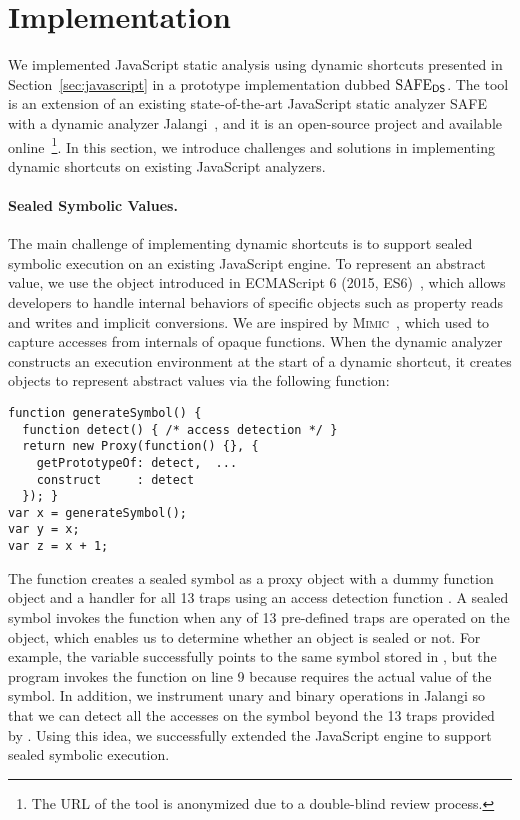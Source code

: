 \section{Implementation}\label{sec:implementation}
We implemented JavaScript static analysis using dynamic shortcuts
presented in Section~\ref{sec:javascript} in a prototype implementation dubbed
$\text{SAFE}_{\textsf{DS}}$.  The tool is an extension of an existing state-of-the-art JavaScript
static analyzer SAFE~\cite{safe, safe2} with a dynamic analyzer
Jalangi~\cite{jalangi}, and it is an open-source project and available online~\footnote{The
URL of the tool is anonymized due to a double-blind review process.}.  In this
section, we introduce challenges and solutions in implementing dynamic
shortcuts on existing JavaScript analyzers.

\paragraph{Sealed Symbolic Values.}
The main challenge of implementing dynamic shortcuts is to support sealed
symbolic execution on an existing JavaScript engine.  To represent an abstract
value, we use the  object introduced in ECMAScript 6
(2015, ES6)~\cite{es6}, which allows developers to handle internal behaviors
of specific objects such as property reads and writes and implicit conversions.
We are inspired by \textsc{Mimic}~\cite{mimic}, which used  to
capture accesses from internals of opaque functions.  When the dynamic analyzer
constructs an execution environment at the start of a dynamic shortcut, it
creates  objects to represent abstract values via the
following  function:
\begin{lstlisting}[style=myJSstyle]
function generateSymbol() {
  function detect() { /* access detection */ }
  return new Proxy(function() {}, {
    getPrototypeOf: detect,  ...
    construct     : detect
  }); }
var x = generateSymbol();
var y = x;
var z = x + 1;
\end{lstlisting}
The function creates a sealed symbol as a proxy object with a dummy
function object and a handler for all 13 traps using an access detection
function .  A sealed symbol invokes the function 
when any of 13 pre-defined traps are operated on the object, which enables us to
determine whether an object is sealed or not.  For example, the variable
 successfully points to the same symbol stored in , but the
program invokes the function  on line 9 because  requires
the actual value of the symbol.  In addition, we instrument unary and binary
operations in Jalangi so that we can detect all the accesses on the
symbol beyond the 13 traps provided by .
Using this idea, we successfully extended the
JavaScript engine to support sealed symbolic execution.

